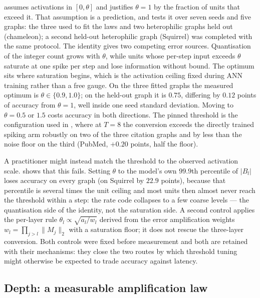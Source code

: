


 assumes activations in $[0,\theta]$ and justifies $\theta=1$ by the fraction of
units that exceed it. That assumption is a prediction, and  tests it over
seven seeds and five graphs: the three used to fit the laws and two heterophilic graphs held out
(chameleon); a second held-out heterophilic graph (Squirrel) was completed with the same protocol.
The identity gives two competing error sources. Quantisation of the integer count grows with
$\theta$, while units whose per-step input exceeds $\theta$ saturate at one spike per step and lose
information without bound. The optimum sits where saturation begins, which is the activation ceiling
fixed during ANN training rather than a free gauge. On the three fitted graphs the measured optimum
is $\theta\in\{0.9,1.0\}$; on the held-out graph it is $0.75$, differing by $0.12$ points of
accuracy from $\theta=1$, well inside one seed standard deviation. Moving to $\theta=0.5$ or $1.5$
costs accuracy in both directions. The pinned threshold is the configuration used in
, where at $T=8$ the conversion exceeds the directly trained spiking arm
robustly on two of the three citation graphs and by less than the noise floor on the third
(PubMed, $+0.20$ points, half the floor).

A practitioner might instead match the threshold to the observed activation scale.
 shows that this fails. Setting $\theta$ to the model's own $99.9$th percentile
of $|B_l|$ loses accuracy on every graph (on Squirrel by $22.9$ points), because that percentile is
several times the unit ceiling and most units then almost never reach the threshold within a step:
the rate code collapses to a few coarse levels --- the quantisation side of the identity, not the
saturation side. A second control applies the per-layer rule
$\theta_l\propto\sqrt{a_l/w_l}$ derived from the error amplification weights
$w_l=\prod_{j>l}\lVert M_j\rVert_{2}$ with a saturation floor; it does not rescue the three-layer
conversion. Both controls were fixed before measurement and both are retained with their mechanisms:
they close the two routes by which threshold tuning might otherwise be expected to trade accuracy
against latency.

\subsection{Depth: a measurable amplification law}
\label{sec:depth}

